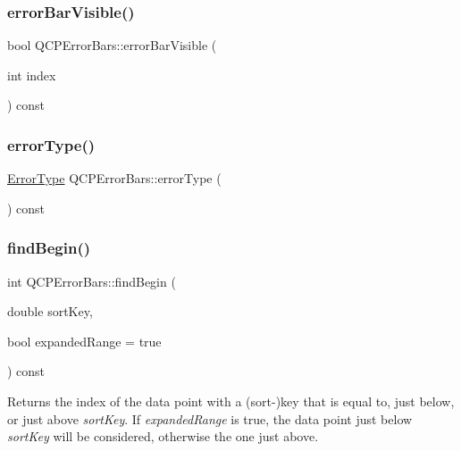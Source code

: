 \subsubsection{\texorpdfstring{errorBarVisible()}{errorBarVisible()}}
{\footnotesize\ttfamily bool Q\+C\+P\+Error\+Bars\+::error\+Bar\+Visible (\begin{DoxyParamCaption}\item[{int}]{index }\end{DoxyParamCaption}) const\hspace{0.3cm}{\ttfamily [protected]}}

\mbox{\label{class_q_c_p_error_bars_a527e7df83c98709cef22a8447fee4f13}} 
\subsubsection{\texorpdfstring{errorType()}{errorType()}}
{\footnotesize\ttfamily \mbox{\hyperlink{class_q_c_p_error_bars_a95f0220f11a72648b96480a85ce26474}{Error\+Type}} Q\+C\+P\+Error\+Bars\+::error\+Type (\begin{DoxyParamCaption}{ }\end{DoxyParamCaption}) const\hspace{0.3cm}{\ttfamily [inline]}}

\mbox{\label{class_q_c_p_error_bars_a74c57d6abb8eda3c4c31b72d1df9f568}} 
\subsubsection{\texorpdfstring{findBegin()}{findBegin()}}
{\footnotesize\ttfamily int Q\+C\+P\+Error\+Bars\+::find\+Begin (\begin{DoxyParamCaption}\item[{double}]{sort\+Key,  }\item[{bool}]{expanded\+Range = {\ttfamily true} }\end{DoxyParamCaption}) const\hspace{0.3cm}{\ttfamily [virtual]}}

Returns the index of the data point with a (sort-\/)key that is equal to, just below, or just above {\itshape sort\+Key}. If {\itshape expanded\+Range} is true, the data point just below {\itshape sort\+Key} will be considered, otherwise the one just above.

